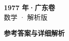 \documentclass[zihao=-4, a4paper]{ctexart}
\begin{document}
\begin{center}
  {\Large\bfseries 1977 年·广东卷}\\[4pt]
  {\large 数学 · 解析版}
\end{center}
\medskip
{}

\clearpage
{}
\begin{center}{\Large\bfseries 参考答案与详细解析}\end{center}
\medskip

\end{document}
